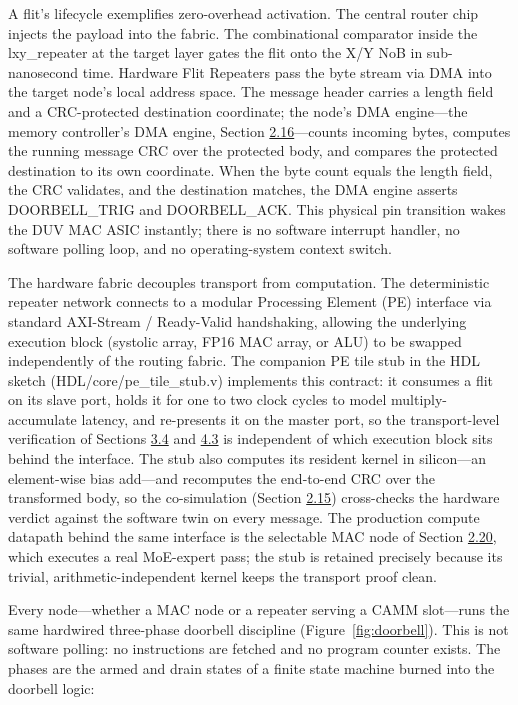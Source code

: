 \documentclass[12pt,onecolumn]{article}
\begin{document}
A flit's lifecycle exemplifies zero-overhead activation. The central router chip injects the payload into the fabric. The combinational comparator inside the lxy\_repeater at the target layer gates the flit onto the X/Y NoB in sub-nanosecond time. Hardware Flit Repeaters pass the byte stream via DMA into the target node's local address space. The message header carries a length field and a CRC-protected destination coordinate; the node's DMA engine---the memory controller's DMA engine, Section \hyperref[sec:2.16]{2.16}---counts incoming bytes, computes the running message CRC over the protected body, and compares the protected destination to its own coordinate. When the byte count equals the length field, the CRC validates, and the destination matches, the DMA engine asserts DOORBELL\_TRIG and DOORBELL\_ACK. This physical pin transition wakes the DUV MAC ASIC instantly; there is no software interrupt handler, no software polling loop, and no operating-system context switch.

The hardware fabric decouples transport from computation. The deterministic repeater network connects to a modular Processing Element (PE) interface via standard AXI-Stream / Ready-Valid handshaking, allowing the underlying execution block (systolic array, FP16 MAC array, or ALU) to be swapped independently of the routing fabric. The companion PE tile stub in the HDL sketch (HDL/core/pe\_tile\_stub.v) implements this contract: it consumes a flit on its slave port, holds it for one to two clock cycles to model multiply-accumulate latency, and re-presents it on the master port, so the transport-level verification of Sections \hyperref[sec:3.4]{3.4} and \hyperref[sec:4.3]{4.3} is independent of which execution block sits behind the interface. The stub also computes its resident kernel in silicon---an element-wise bias add---and recomputes the end-to-end CRC over the transformed body, so the co-simulation (Section \hyperref[sec:2.15]{2.15}) cross-checks the hardware verdict against the software twin on every message. The production compute datapath behind the same interface is the selectable MAC node of Section \hyperref[sec:2.20]{2.20}, which executes a real MoE-expert pass; the stub is retained precisely because its trivial, arithmetic-independent kernel keeps the transport proof clean.

Every node---whether a MAC node or a repeater serving a CAMM slot---runs the same hardwired three-phase doorbell discipline (Figure~\ref{fig:doorbell}). This is not software polling: no instructions are fetched and no program counter exists. The phases are the armed and drain states of a finite state machine burned into the doorbell logic:
\end{document}
